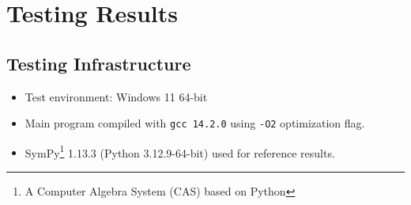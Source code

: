 \documentclass{report}
\begin{document}
\newpage
\chapter{Testing Results}
\section*{Testing Infrastructure}
\begin{itemize}
    \item Test environment: Windows 11 64-bit
    \item Main program compiled with \texttt{gcc 14.2.0} using \texttt{-O2} optimization flag.
    \item SymPy\footnote{A Computer Algebra System (CAS) based on Python} 1.13.3 (Python 3.12.9-64-bit) used for reference results.
\end{itemize}
\end{document}
